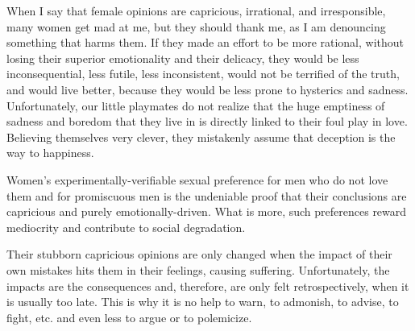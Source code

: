 \par When I say that female opinions are capricious, irrational, and irresponsible, many women get mad at me, but they should thank me, as I am denouncing something that harms them. If they made an effort to be more rational, without losing their superior emotionality and their delicacy, they would be less inconsequential, less futile, less inconsistent, would not be terrified of the truth, and would live better, because they would be less prone to hysterics and sadness. Unfortunately, our little playmates do not realize that the huge emptiness of sadness and boredom that they live in is directly linked to their foul play in love. Believing themselves very clever, they mistakenly assume that deception is the way to happiness.

\par Women's experimentally-verifiable sexual preference for men who do not love them and for promiscuous men is the undeniable proof that their conclusions are capricious and purely emotionally-driven. What is more, such preferences reward mediocrity and contribute to social degradation.

\par Their stubborn capricious opinions are only changed when the impact of their own mistakes hits them in their feelings, causing suffering. Unfortunately, the impacts are the consequences and, therefore, are only felt retrospectively, when it is usually too late. This is why it is no help to warn, to admonish, to advise, to fight, etc. and even less to argue or to polemicize.